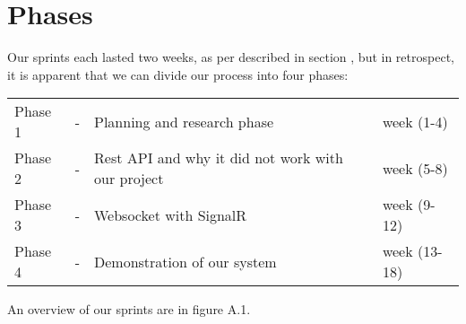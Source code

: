 \chapter{Phases}
Our sprints each lasted two weeks, as per described in section , but in retrospect, it is apparent that we can divide our process into four phases:

\begin{center}
	\begin{tabular}{lcll}
		Phase 1 & - & Planning and research phase & week (1-4) \\
		Phase 2& - & Rest API and why it did not work with our project& week (5-8) \\
		Phase 3 & - & Websocket with SignalR & week (9-12) \\
		Phase 4 & - & Demonstration of our system & week (13-18) 
	\end{tabular}
\end{center}

An overview of our sprints are in figure A.1.

%
%
%






